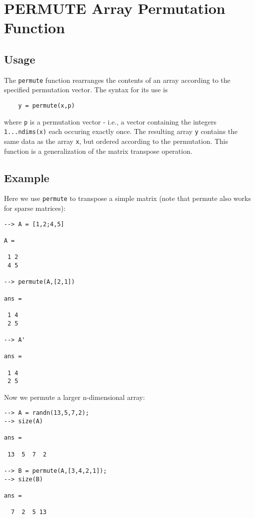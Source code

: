 \section{PERMUTE Array Permutation Function}

\subsection{Usage}

The \verb|permute| function rearranges the contents of an array according
to the specified permutation vector.  The syntax for its use is
\begin{verbatim}
    y = permute(x,p)
\end{verbatim}
where \verb|p| is a permutation vector - i.e., a vector containing the 
integers \verb|1...ndims(x)| each occuring exactly once.  The resulting
array \verb|y| contains the same data as the array \verb|x|, but ordered
according to the permutation.  This function is a generalization of
the matrix transpose operation.
\subsection{Example}

Here we use \verb|permute| to transpose a simple matrix (note that permute
also works for sparse matrices):
\begin{verbatim}
--> A = [1,2;4,5]

A = 

 1 2 
 4 5 

--> permute(A,[2,1])

ans = 

 1 4 
 2 5 

--> A'

ans = 

 1 4 
 2 5 
\end{verbatim}
Now we permute a larger n-dimensional array:
\begin{verbatim}
--> A = randn(13,5,7,2);
--> size(A)

ans = 

 13  5  7  2 

--> B = permute(A,[3,4,2,1]);
--> size(B)

ans = 

  7  2  5 13 
\end{verbatim}
